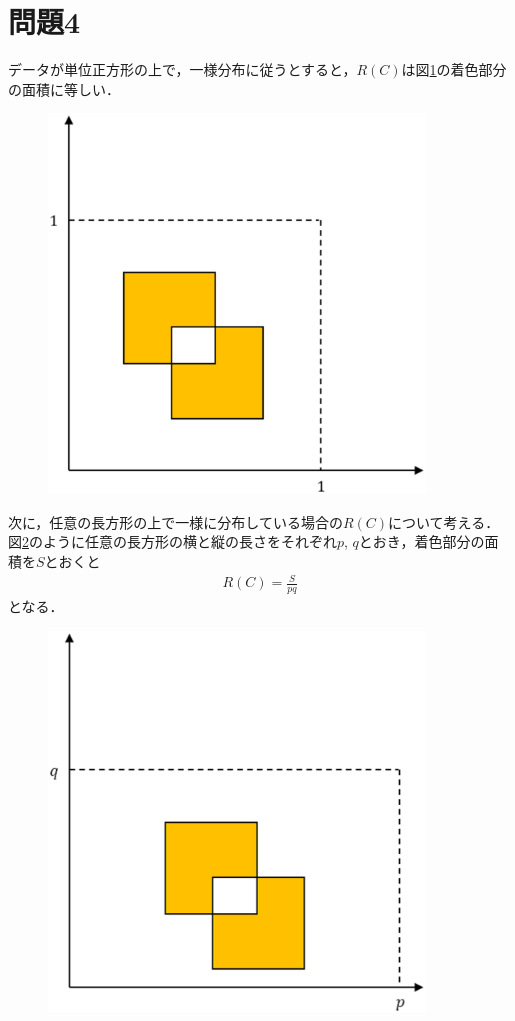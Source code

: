 \section*{問題4}
\noindent
データが単位正方形の上で，一様分布に従うとすると，$R(C)$は図\ref{4-1}の着色部分の面積に等しい．
\begin{figure}[H]
    \begin{center}
        \includegraphics[width=100mm]{./figures/section_4/figure1.eps}
        \label{4-1}
    \end{center}
\end{figure}
次に，任意の長方形の上で一様に分布している場合の$R(C)$について考える．\\
図\ref{4-2}のように任意の長方形の横と縦の長さをそれぞれ$p$, $q$とおき，着色部分の面積を$S$とおくと
\begin{eqnarray*}
    R(C)=\frac{S}{pq}
\end{eqnarray*}
となる．
\begin{figure}[H]
    \begin{center}
        \includegraphics[width=100mm]{./figures/section_4/figure2.eps}
        \label{4-2}
    \end{center}
\end{figure}